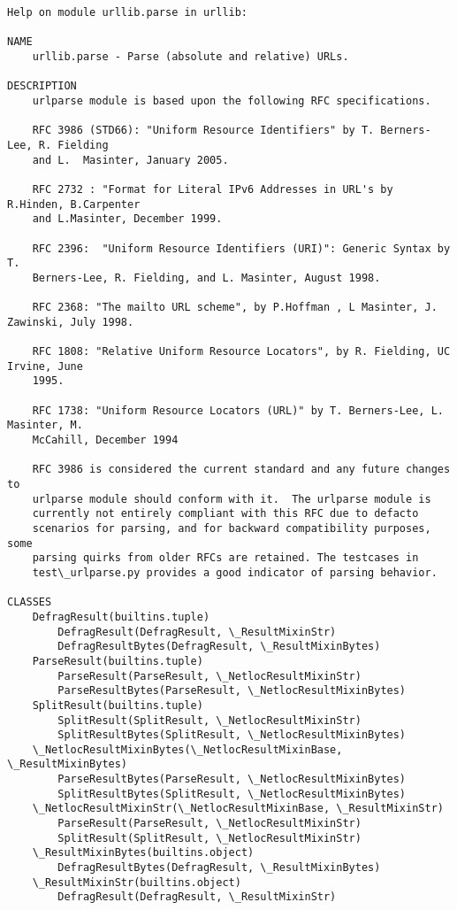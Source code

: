\documentclass[11pt]{article}
\begin{document}
    \begin{Verbatim}[commandchars=\\\{\}]
Help on module urllib.parse in urllib:

NAME
    urllib.parse - Parse (absolute and relative) URLs.

DESCRIPTION
    urlparse module is based upon the following RFC specifications.
    
    RFC 3986 (STD66): "Uniform Resource Identifiers" by T. Berners-Lee, R. Fielding
    and L.  Masinter, January 2005.
    
    RFC 2732 : "Format for Literal IPv6 Addresses in URL's by R.Hinden, B.Carpenter
    and L.Masinter, December 1999.
    
    RFC 2396:  "Uniform Resource Identifiers (URI)": Generic Syntax by T.
    Berners-Lee, R. Fielding, and L. Masinter, August 1998.
    
    RFC 2368: "The mailto URL scheme", by P.Hoffman , L Masinter, J. Zawinski, July 1998.
    
    RFC 1808: "Relative Uniform Resource Locators", by R. Fielding, UC Irvine, June
    1995.
    
    RFC 1738: "Uniform Resource Locators (URL)" by T. Berners-Lee, L. Masinter, M.
    McCahill, December 1994
    
    RFC 3986 is considered the current standard and any future changes to
    urlparse module should conform with it.  The urlparse module is
    currently not entirely compliant with this RFC due to defacto
    scenarios for parsing, and for backward compatibility purposes, some
    parsing quirks from older RFCs are retained. The testcases in
    test\_urlparse.py provides a good indicator of parsing behavior.

CLASSES
    DefragResult(builtins.tuple)
        DefragResult(DefragResult, \_ResultMixinStr)
        DefragResultBytes(DefragResult, \_ResultMixinBytes)
    ParseResult(builtins.tuple)
        ParseResult(ParseResult, \_NetlocResultMixinStr)
        ParseResultBytes(ParseResult, \_NetlocResultMixinBytes)
    SplitResult(builtins.tuple)
        SplitResult(SplitResult, \_NetlocResultMixinStr)
        SplitResultBytes(SplitResult, \_NetlocResultMixinBytes)
    \_NetlocResultMixinBytes(\_NetlocResultMixinBase, \_ResultMixinBytes)
        ParseResultBytes(ParseResult, \_NetlocResultMixinBytes)
        SplitResultBytes(SplitResult, \_NetlocResultMixinBytes)
    \_NetlocResultMixinStr(\_NetlocResultMixinBase, \_ResultMixinStr)
        ParseResult(ParseResult, \_NetlocResultMixinStr)
        SplitResult(SplitResult, \_NetlocResultMixinStr)
    \_ResultMixinBytes(builtins.object)
        DefragResultBytes(DefragResult, \_ResultMixinBytes)
    \_ResultMixinStr(builtins.object)
        DefragResult(DefragResult, \_ResultMixinStr)
    

\end{Verbatim}
\end{document}
